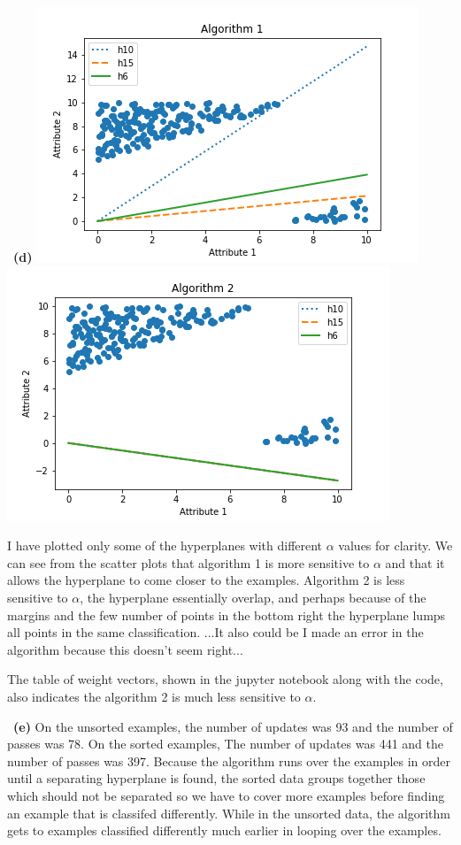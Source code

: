 \documentclass[a4 paper, 15pt]{article}
\numberwithin{equation}{section}
\newcommand{\subproblem}[1]{~\newline\textbf{(#1)}}
\begin{document}
\par
\subproblem{d}
\includegraphics[scale=.5]{algorithm1}
\includegraphics[scale=.5]{algorithm2}
\par
I have plotted only some of the hyperplanes with different $\alpha$ values for clarity. We can see from the scatter plots that algorithm 1 is more sensitive to $\alpha$ and that it allows the hyperplane to come closer to the examples. Algorithm 2 is less sensitive to $\alpha$, the hyperplane essentially overlap, and perhaps because of the margins and the few number of points in the bottom right the hyperplane lumps all points in the same classification. ...It also could be I made an error in the algorithm because this doesn't seem right...
\par
The table of weight vectors, shown in the jupyter notebook along with the code, also indicates the algorithm 2 is much less sensitive to $\alpha$.
\par
\subproblem{e} On the unsorted examples, the number of updates was  93  and the number of passes was  78.  On the sorted examples, The number of updates was  441  and the number of passes was  397.  Because the algorithm runs over the examples in order until a separating hyperplane is found, the sorted data groups together those which should not be separated so we have to cover more examples before finding an example that is classifed differently. While in the unsorted data, the algorithm gets to examples classified differently much earlier in looping over the examples. 
\end{document}
